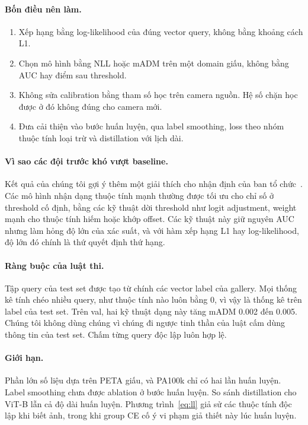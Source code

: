 \documentclass[11pt,a4paper]{article}
\begin{document}
\paragraph{Bốn điều nên làm.}
\begin{enumerate}[leftmargin=1.6em]
\item Xếp hạng bằng log-likelihood của đúng vector query, không bằng khoảng cách L1.
\item Chọn mô hình bằng NLL hoặc mADM trên một domain giấu, không bằng AUC hay điểm sau threshold.
\item Không sửa calibration bằng tham số học trên camera nguồn. Hệ số chặn học được ở đó không đúng cho camera mới.
\item Đưa cải thiện vào bước huấn luyện, qua label smoothing, loss theo nhóm thuộc tính loại trừ và distillation với lịch dài.
\end{enumerate}

\paragraph{Vì sao các đội trước khó vượt baseline.} Kết quả của chúng tôi gợi ý thêm một giải thích cho nhận định của ban tổ chức~\cite{upar24}. Các mô hình nhận dạng thuộc tính mạnh thường được tối ưu cho chỉ số ở threshold cố định, bằng các kỹ thuật dời threshold như logit adjustment, weight mạnh cho thuộc tính hiếm hoặc khớp offset. Các kỹ thuật này giữ nguyên AUC nhưng làm hỏng độ lớn của xác suất, và với hàm xếp hạng L1 hay log-likelihood, độ lớn đó chính là thứ quyết định thứ hạng.

\paragraph{Ràng buộc của luật thi.}
\label{sec:rules}
Tập query của test set được tạo từ chính các vector label của gallery. Mọi thống kê tính chéo nhiều query, như thuộc tính nào luôn bằng 0, vì vậy là thống kê trên label của test set. Trên val, hai kỹ thuật dạng này tăng mADM 0.002 đến 0.005. Chúng tôi không dùng chúng vì chúng đi ngược tinh thần của luật cấm dùng thông tin của test set. Chấm từng query độc lập luôn hợp lệ.

\paragraph{Giới hạn.} Phần lớn số liệu dựa trên PETA giấu, và PA100k chỉ có hai lần huấn luyện. Label smoothing chưa được ablation ở bước huấn luyện. So sánh distillation cho ViT-B lẫn cả độ dài huấn luyện. Phương trình~\eqref{eq:ll} giả sử các thuộc tính độc lập khi biết ảnh, trong khi group CE cố ý vi phạm giả thiết này lúc huấn luyện.
\end{document}
